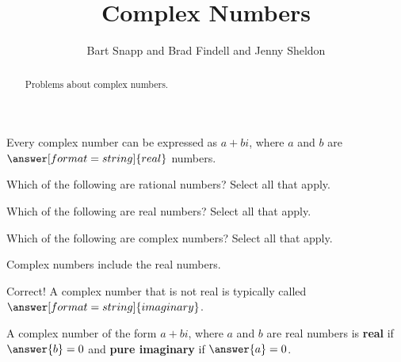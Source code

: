 \documentclass[nooutcomes]{ximera}
\title{Complex Numbers}
\author{Bart Snapp and Brad Findell and Jenny Sheldon}
\begin{document}
\begin{abstract}
Problems about complex numbers.
\end{abstract}
\maketitle



\begin{problem}
Every complex number can be expressed as $a+bi$, where $a$ and $b$ are $\answer[format=string]{real}$ numbers.  
\end{problem}

\begin{problem}
Which of the following are rational numbers?  Select all that apply.

\begin{selectAll}
\end{selectAll}
\end{problem}



\begin{problem}
Which of the following are real numbers?  Select all that apply.

\begin{selectAll}
\end{selectAll}
\end{problem}



\begin{problem}
Which of the following are complex numbers?  Select all that apply.

\begin{selectAll}
\end{selectAll}
\begin{hint}
Complex numbers include the real numbers.
\end{hint}
\begin{problem}
Correct!  A complex number that is not real is typically called 
$\answer[format=string]{imaginary}$. 

A complex number of the form $a+bi$, where $a$ and $b$ are real numbers is \textbf{real} if $\answer{b}=0$ and 
\textbf{pure imaginary} if $\answer{a}=0$.  
\end{problem}
\end{problem}
\end{document}
